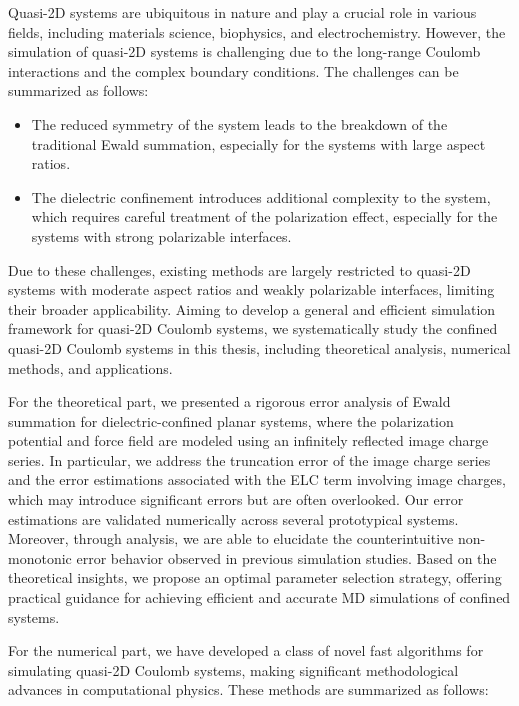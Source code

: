Quasi-2D systems are ubiquitous in nature and play a crucial role in various fields, including materials science, biophysics, and electrochemistry. 
However, the simulation of quasi-2D systems is challenging due to the long-range Coulomb interactions and the complex boundary conditions.
The challenges can be summarized as follows:
\begin{itemize}
    \item[1.] The reduced symmetry of the system leads to the breakdown of the traditional Ewald summation, especially for the systems with large aspect ratios.
    \item[2.] The dielectric confinement introduces additional complexity to the system, which requires careful treatment of the polarization effect, especially for the systems with strong polarizable interfaces.
\end{itemize}
Due to these challenges, existing methods are largely restricted to quasi-2D systems with moderate aspect ratios and weakly polarizable interfaces, limiting their broader applicability.
Aiming to develop a general and efficient simulation framework for quasi-2D Coulomb systems, we systematically study the confined quasi-2D Coulomb systems in this thesis, including theoretical analysis, numerical methods, and applications.

For the theoretical part, we presented a rigorous error analysis of Ewald summation for dielectric-confined planar systems, where the polarization potential and force field are modeled using an infinitely reflected image charge series. 
In particular, we address the truncation error of the image charge series and the error estimations associated with the ELC term involving image charges, which may introduce significant errors but are often overlooked.
Our error estimations are validated numerically across several prototypical systems. Moreover, through analysis, we are able to elucidate the counterintuitive non-monotonic error behavior observed in previous simulation studies.
Based on the theoretical insights, we propose an optimal parameter selection strategy, offering practical guidance for achieving efficient and accurate MD simulations of confined systems.

For the numerical part, we have developed a class of novel fast algorithms for simulating quasi-2D Coulomb systems, making significant methodological advances in computational physics. 
These methods are summarized as follows:

